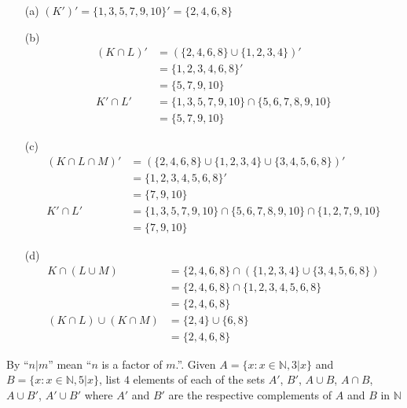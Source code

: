 \answer
\begin{itemize}
    \item[(a)]
        $(K')' = \{1, 3, 5, 7, 9, 10\}' = \{2, 4, 6, 8\}$
    \item[(b)]
        \begin{align*}
            (K \cap L)' &= (\{2, 4, 6, 8\} \cup \{1, 2, 3, 4\})'\\
                        &= \{1, 2, 3, 4, 6, 8\}' \\
                        &= \{5, 7, 9, 10\} \\
            K' \cap L' &= \{1, 3, 5, 7, 9, 10\} \cap \{5, 6, 7, 8, 9, 10\} \\
                        &= \{5, 7, 9, 10\}
        \end{align*}
    \item[(c)]
        \begin{align*}
            (K \cap L \cap M)' &= (\{2, 4, 6, 8\} \cup \{1, 2, 3, 4\} \cup \{3, 4, 5, 6, 8\})'\\
                        &= \{1, 2, 3, 4, 5, 6, 8\}' \\
                        &= \{7, 9, 10\} \\
            K' \cap L' &= \{1, 3, 5, 7, 9, 10\} \cap \{5, 6, 7, 8, 9, 10\} \cap \{1, 2, 7, 9, 10\}\\
                        &= \{7, 9, 10\}
        \end{align*}
    \item[(d)]
        \begin{align*}
            K \cap (L \cup M) &= \{2, 4, 6, 8\} \cap (\{1, 2, 3, 4\} \cup \{3, 4, 5, 6, 8\}) \\
                              &= \{2,4,6,8\} \cap \{1,2,3,4,5,6,8\} \\
                              &= \{2,4,6,8\} \\
            (K \cap L) \cup (K \cap M) &= \{2, 4\} \cup \{6, 8\} \\
                                       &= \{2, 4, 6, 8\}
        \end{align*}
\end{itemize}


\exercise
By ``$n|m$'' mean ``$n$ is a factor of $m$.''. Given $A = \{x : x \in \mathbb{N}, 3|x\}$ and $B = \{x:x \in \mathbb{N}, 5|x\}$, list $4$ elements of each of the sets $A'$, $B'$, $A \cup B$, $A \cap B$, $A \cup B'$, $A' \cup B'$ where $A'$ and $B'$ are the respective complements of $A$ and $B$ in $\mathbb{N}$

